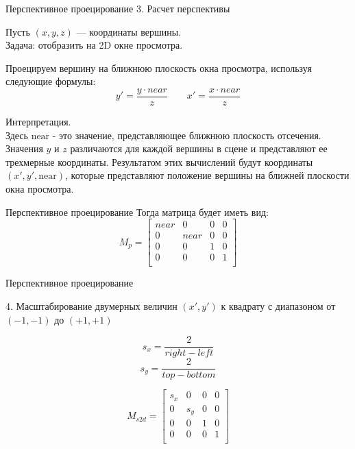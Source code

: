 \documentclass{beamer}
\begin{document}
	\begin{frame}{Перспективное проецирование}
		3. Расчет перспективы

		Пусть $(x, y, z)$ --- координаты вершины. \\ 
		Задача: отобразить на 2D окне просмотра.

    Проецируем вершину на ближнюю плоскость окна просмотра, используя следующие формулы:
        \[
					y' = \frac{y \cdot near}{z} 
				\qquad
					x' = \frac {x \cdot near} {z}
				\]

		Интерпретация. \\
    Здесь $\text{near}$ - это значение, представляющее ближнюю плоскость отсечения. Значения $y$ и $z$ различаются для каждой вершины в сцене и представляют ее трехмерные координаты. Результатом этих вычислений будут координаты $(x', y', \text{near})$, которые представляют положение вершины на ближней плоскости окна просмотра.


	\end{frame}

	\begin{frame}{Перспективное проецирование}
		Тогда матрица будет иметь вид:
 \[
	M_p = 
	 \begin{bmatrix}
		near & 0 & 0 & 0 \\
		0 & near & 0 & 0 \\
		0 & 0 & 1 & 0 \\
		0 & 0 & 0 & 1 \\
	\end{bmatrix}	
	\]
	\end{frame}

	\begin{frame}{Перспективное проецирование}

		4. Масштабирование двумерных величин $(x', y')$ к квадрату с диапазоном от $(-1, -1)$ до $(+1, +1)$

		\[
			s_x = \frac{2}{right - left}
		\]
		\[
			s_y = \frac{2}{top - bottom}
		\]

		\[
			M_{s2d} = 
			\begin{bmatrix}
				s_x & 0 & 0 & 0 \\
				0 & s_y & 0 & 0 \\
				0 & 0 & 1 & 0 \\
				0 & 0 & 0 & 1 \\
			\end{bmatrix}	
		\]
	\end{frame}
\end{document}
